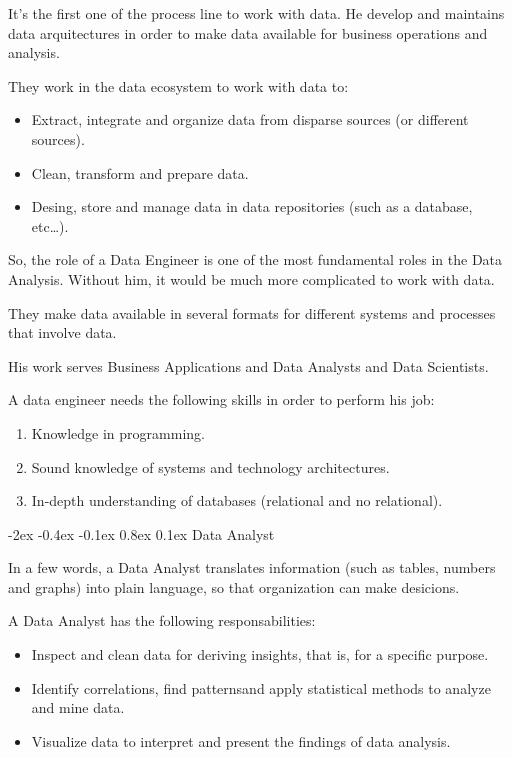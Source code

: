 \documentclass[12pt]{report}
\makeatletter
\renewcommand{\subsection}{\@startsection{subsection}{2}{\z@}%
  {-2ex \@plus -0.4ex \@minus -0.1ex}%
  {0.8ex \@plus 0.1ex}%
  {\normalfont\large\subsectionstyle}}
\newcommand{\subsectionstyle}[1]{%
  \par\noindent\hrule
  \vspace{-0.4ex}%
  {\scshape #1\par}%
  \vspace{0.4ex}%
  \hrule
}
\theoremstyle{largebreak}
\makeatother
\begin{document}
    It's the first one of the process line to work with data. He develop and maintains data arquitectures in order to make data available for business operations and analysis.

    They work in the data ecosystem to work with data to:
    \begin{itemize}
        \item Extract, integrate and organize data from disparse sources (or different sources).
        \item Clean, transform and prepare data.
        \item Desing, store and manage data in data repositories (such as a database, etc\dots).
    \end{itemize}
    So, the role of a Data Engineer is one of the most fundamental roles in the Data Analysis. Without him, it would be much more complicated to work with data.

    \begin{obs}
        They make data available in several formats for different systems and processes that involve data.
    \end{obs}

    His work serves Business Applications and Data Analysts and Data Scientists.

    \begin{obs}
        A data engineer needs the following skills in order to perform his job:
        \begin{enumerate}[label = \textit{(\arabic*)}]
            \item Knowledge in programming.
            \item Sound knowledge of systems and technology architectures.
            \item In-depth understanding of databases (relational and no relational).
        \end{enumerate}
    \end{obs}

    \subsection{Data Analyst}

    In a few words, a Data Analyst translates information (such as tables, numbers and graphs) into plain language, so that organization can make desicions.

    \begin{obs}
        A Data Analyst has the following responsabilities:
        \begin{itemize}
            \item Inspect and clean data for deriving insights, that is, for a specific purpose.
            \item Identify correlations, find patternsand apply statistical methods to analyze and mine data.
            \item Visualize data to interpret and present the findings of data analysis.
        \end{itemize}
    \end{obs}
\end{document}

